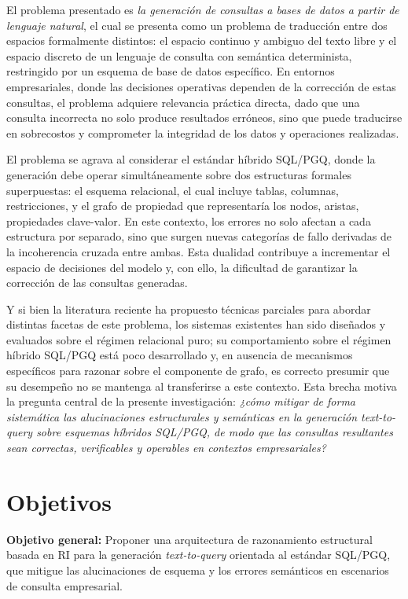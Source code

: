 El problema presentado es \emph{la generación de consultas a bases de datos a partir de lenguaje natural}, el cual se presenta como un problema de traducción entre dos espacios formalmente distintos: el espacio continuo y ambiguo del texto libre y el espacio discreto de un lenguaje de consulta con semántica determinista, restringido por un esquema de base de datos específico. En entornos empresariales, donde las decisiones operativas dependen de la corrección de estas consultas, el problema adquiere relevancia práctica directa, dado que una consulta incorrecta no solo produce resultados erróneos, sino que puede traducirse en sobrecostos y comprometer la integridad de los datos y operaciones realizadas.

El problema se agrava al considerar el estándar híbrido \ac{SQL}/\ac{PGQ}, donde la generación debe operar simultáneamente sobre dos estructuras formales superpuestas: el esquema relacional, el cual incluye tablas, columnas, restricciones, y el grafo de propiedad  que representaría los nodos, aristas, propiedades clave-valor.  En este contexto, los errores no solo afectan a cada estructura por separado, sino que surgen nuevas categorías de fallo derivadas de la incoherencia cruzada entre ambas. Esta dualidad contribuye a incrementar el espacio de decisiones del modelo y, con ello, la dificultad de garantizar la corrección de las consultas generadas.

Y si bien la literatura reciente ha propuesto técnicas parciales para abordar distintas facetas de este problema, los sistemas existentes han sido diseñados y evaluados sobre el régimen relacional puro; su comportamiento sobre el régimen híbrido \ac{SQL}/\ac{PGQ} está poco desarrollado y, en ausencia de mecanismos específicos para razonar sobre el componente de grafo, es correcto presumir que su desempeño no se mantenga al transferirse a este contexto. Esta brecha motiva la pregunta central de la presente investigación: \textit{¿cómo mitigar de forma sistemática las alucinaciones estructurales y semánticas en la generación \emph{text-to-query} sobre esquemas híbridos \ac{SQL}/\ac{PGQ}, de modo que las consultas resultantes sean correctas, verificables y operables en contextos empresariales?}


\section{Objetivos}

\textbf{Objetivo general:} Proponer una arquitectura de razonamiento estructural basada en \ac{RI} para la generación \emph{text-to-query} orientada al estándar \ac{SQL}/\ac{PGQ}, que mitigue las alucinaciones de esquema y los errores semánticos en escenarios de consulta empresarial.

